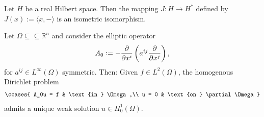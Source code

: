 \begin{theorem}
	\label{thm:RRT}
	Let $H$ be a real Hilbert space. Then the mapping $J : H \to H^*$ defined by $J(x) := \langle x,-\rangle$ is an isometric isomorphism.
\end{theorem}

\begin{theorem}
	Let $\Omega \subseteq\subseteq \mathbb{R}^n$ and consider the elliptic operator
	\begin{equation*}
		A_0 := -\frac{\partial}{\partial x^i}\del[3]{a^{ij}\frac{\partial}{\partial x^j}},
	\end{equation*}
	\noindent for $a^{ij} \in L^\infty(\Omega)$ symmetric. Then: Given $f \in L^2(\Omega)$, the homogenous Dirichlet problem
	\begin{align}
		\label{eq:HDP}
		\ccases{
			A_0u = f & \text{in } \Omega,\\
			u = 0 & \text{on } \partial\Omega
		}
	\end{align}
	\noindent admits a unique weak solution $u \in H^1_0(\Omega)$.
\end{theorem}

